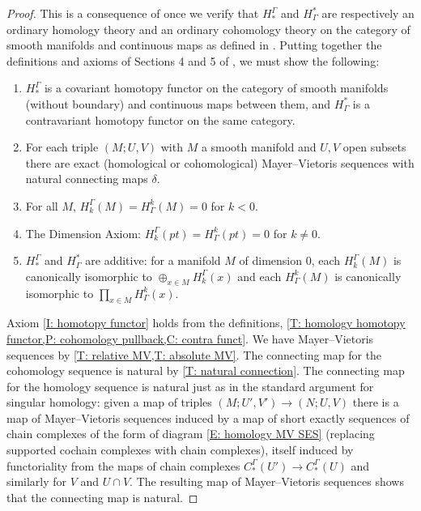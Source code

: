 \begin{proof}
	This is a consequence of \cite[Proposition 10]{Krec10b} once we verify that $H_*^\Gamma$ and $H^*_\Gamma$ are respectively an ordinary homology theory and an ordinary cohomology theory on the category of smooth manifolds and continuous maps as defined in \cite{Krec10b}.
	Putting together the definitions and axioms of Sections 4 and 5 of \cite{Krec10b}, we must show the following:

	\begin{enumerate}
		\item\label{I: homotopy functor} $H_*^\Gamma$ is a covariant homotopy functor on the category of smooth manifolds (without boundary) and continuous maps between them, and $H^*_\Gamma$ is a contravariant homotopy functor on the same category.

		\item For each triple $(M;U,V)$ with $M$ a smooth manifold and $U,V$ open subsets there are exact (homological or cohomological) Mayer--Vietoris sequences with natural connecting maps $\delta$.

		\item\label{I: neg dim} For all $M$, $H_k^\Gamma(M) = H^k_\Gamma(M) = 0$ for $k<0$.

		\item The Dimension Axiom: $H_k^\Gamma(pt) = H^k_\Gamma(pt) = 0$ for $k\neq 0$.

		\item $H_*^\Gamma$ and $H^*_\Gamma$ are additive: for a manifold $M$ of dimension $0$, each $H_k^\Gamma(M)$ is canonically isomorphic to $\oplus_{x \in M} H_k^\Gamma(x)$ and each $H^k_\Gamma(M)$ is canonically isomorphic to $\prod_{x \in M} H^k_\Gamma(x)$.
	\end{enumerate}

	Axiom \ref{I: homotopy functor} holds from the definitions, \cref{T: homology homotopy functor,P: cohomology pullback,C: contra funct}.
	We have Mayer--Vietoris sequences by \cref{T: relative MV,T: absolute MV}.
	The connecting map for the cohomology sequence is natural by \cref{T: natural connection}.
	The connecting map for the homology sequence is natural just as in the standard argument for singular homology: given a map of triples $(M;U',V') \to (N;U,V)$ there is a map of Mayer--Vietoris sequences induced by a map of short exactly sequences of chain complexes of the form of diagram \eqref{E: homology MV SES} (replacing supported cochain complexes with chain complexes), itself induced by functoriality from the maps of chain complexes $C_*^{\Gamma}(U') \to C_*^{\Gamma}(U)$ and similarly for $V$ and $U \cap V$.
	The resulting map of Mayer--Vietoris sequences shows that the connecting map is natural.


\end{proof}
